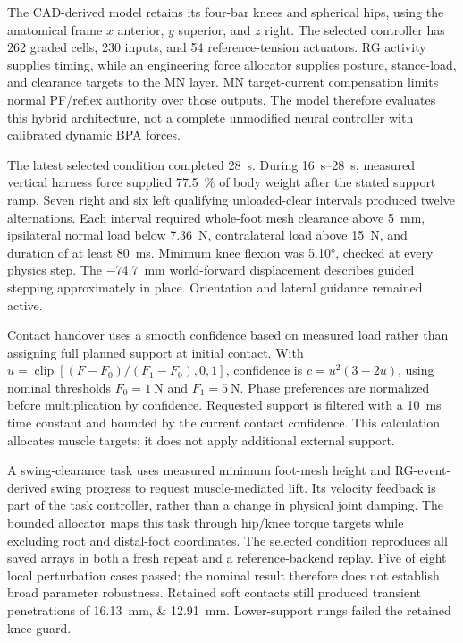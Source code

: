 The CAD-derived model retains its four-bar knees and spherical hips, using the anatomical frame $x$ anterior, $y$ superior, and $z$ right. The selected controller has 262 graded cells, 230 inputs, and 54 reference-tension actuators. RG activity supplies timing, while an engineering force allocator supplies posture, stance-load, and clearance targets to the MN layer. MN target-current compensation limits normal PF/reflex authority over those outputs. The model therefore evaluates this hybrid architecture, not a complete unmodified neural controller with calibrated dynamic BPA forces.

The latest selected condition completed \qty{28}{\second}. During \qtyrange{16}{28}{\second}, measured vertical harness force supplied \qty{77.5}{\percent} of body weight after the stated support ramp. Seven right and six left qualifying unloaded-clear intervals produced twelve alternations. Each interval required whole-foot mesh clearance above \qty{5}{\milli\meter}, ipsilateral normal load below \qty{7.36}{\newton}, contralateral load above \qty{15}{\newton}, and duration of at least \qty{80}{\milli\second}. Minimum knee flexion was \ang{5.10}, checked at every physics step. The \qty{-74.7}{\milli\meter} world-forward displacement describes guided stepping approximately in place. Orientation and lateral guidance remained active.

Contact handover uses a smooth confidence based on measured load rather than assigning full planned support at initial contact. With $u=\operatorname{clip}[(F-F_0)/(F_1-F_0),0,1]$, confidence is $c=u^2(3-2u)$, using nominal thresholds $F_0=\qty{1}{\newton}$ and $F_1=\qty{5}{\newton}$. Phase preferences are normalized before multiplication by confidence. Requested support is filtered with a \qty{10}{\milli\second} time constant and bounded by the current contact confidence. This calculation allocates muscle targets; it does not apply additional external support.

A swing-clearance task uses measured minimum foot-mesh height and RG-event-derived swing progress to request muscle-mediated lift. Its velocity feedback is part of the task controller, rather than a change in physical joint damping. The bounded allocator maps this task through hip/knee torque targets while excluding root and distal-foot coordinates. The selected condition reproduces all saved arrays in both a fresh repeat and a reference-backend replay. Five of eight local perturbation cases passed; the nominal result therefore does not establish broad parameter robustness. Retained soft contacts still produced transient penetrations of \qtylist{16.13;12.91}{\milli\meter}. Lower-support rungs failed the retained knee guard.

